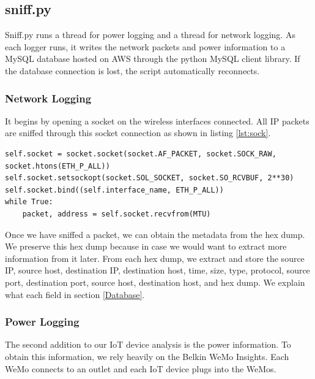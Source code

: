 \subsection{sniff.py}
\label{sniff.py}

Sniff.py runs a thread for power logging and a thread for network logging. As each logger runs, it writes the network packets and power information to a MySQL database hosted on AWS through the python MySQL client \cite{mysqlclient} library. If the database connection is lost, the script automatically reconnects.

\subsubsection{Network Logging}

It begins by opening a socket on the wireless interfaces connected. All IP packets are sniffed through this socket connection as shown in listing \ref{lst:sock}.

\noindent
\begin{minipage}{\textwidth}
\begin{lstlisting}[label={lst:sock},caption={Open and Read from a Socket},captionpos=b]
self.socket = socket.socket(socket.AF_PACKET, socket.SOCK_RAW, socket.htons(ETH_P_ALL))
self.socket.setsockopt(socket.SOL_SOCKET, socket.SO_RCVBUF, 2**30)
self.socket.bind((self.interface_name, ETH_P_ALL))
while True:
    packet, address = self.socket.recvfrom(MTU)
\end{lstlisting}
\end{minipage}

Once we have sniffed a packet, we can obtain the metadata from the hex dump. We preserve this hex dump because in case we would want to extract more information from it later. From each hex dump, we extract and store the source IP, source host, destination IP, destination host, time, size, type, protocol, source port, destination port, source host, destination host, and hex dump. We explain what each field in section \ref{Database}.

\subsubsection{Power Logging}

The second addition to our IoT device analysis is the power information. To obtain this information, we rely heavily on the Belkin WeMo Insights. Each WeMo connects to an outlet and each IoT device plugs into the WeMos.

